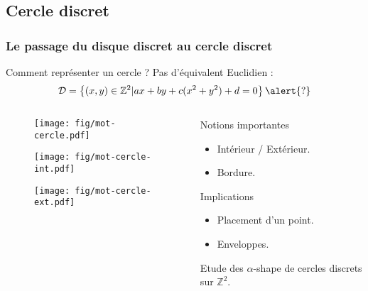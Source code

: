 \documentclass{beamer}
\begin{document}
\subsection{Cercle discret}
\begin{frame}
\frametitle{Le passage du disque discret au cercle discret}

  \begin{block}{Comment représenter un cercle ?}
    Pas d'équivalent Euclidien : 
    \vspace{-0.4cm}
    $$\mathcal{D} =  \left\{(x,y) \in \mathbb{Z}^{2} |  ax + by + c(x^2 + y^2) + d = 0 \right\} \alert{?} $$ 
  \end{block}
  
  \begin{columns}[t]
    \begin{column}{6cm}
      {
        \begin{figure}[h!]
          \centering
          \texttt{[image: fig/mot-cercle.pdf]}
        \end{figure}
      }
      {
        \begin{figure}[h!]
          \centering
          \texttt{[image: fig/mot-cercle-int.pdf]}
        \end{figure}
      }
      {
        \begin{figure}[h!]
          \centering
          \texttt{[image: fig/mot-cercle-ext.pdf]}
        \end{figure}
      }
    \end{column}

    \begin{column}{5cm}
      \vspace{-0.4cm}
      \begin{exampleblock}{Notions importantes}
        \begin{itemize}
          \item Intérieur / Extérieur.
          \item Bordure.
        \end{itemize}
      \end{exampleblock}
      \begin{block}{Implications}
        \begin{itemize}
          \item Placement d'un point.
          \item Enveloppes.
        \end{itemize}
      \end{block}

      {
        \begin{center}  
          \alert{Etude des $\alpha$-shape de cercles discrets sur $\mathbb{Z}^{2}$.}
        \end{center}
      }
    \end{column}
  \end{columns} 
  

\end{frame}
\end{document}
